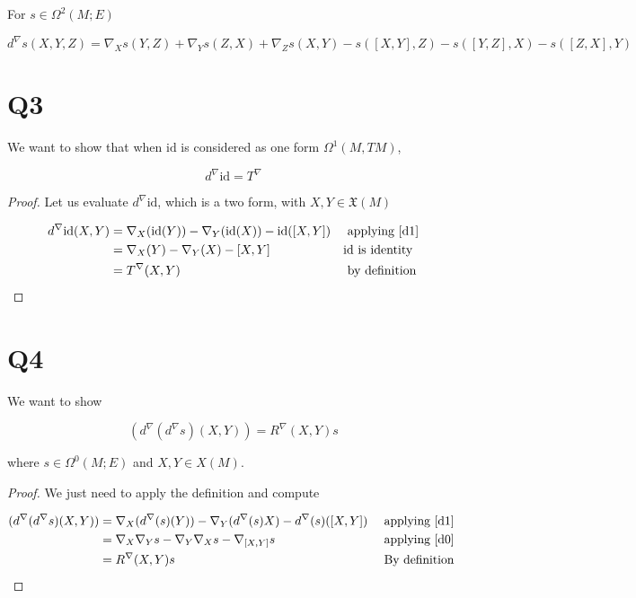 \documentclass{article}
\theoremstyle{definition}
\theoremstyle{definition}
\theoremstyle{remark}
\newcommand{\X}{\mathfrak{X}}
\newcommand{\id}{\text{id}}
\renewcommand{\d}{d^{\nabla}}
\newcommand{\R}{R^{\nabla}}
\begin{document}
For $s \in \Omega^2(M; E)$

\begin{dmath}
	\label{d2}
	\d s (X, Y, Z) = \nabla_X s (Y, Z) + \nabla_Y s(Z, X) + \nabla_Z s (X, Y) - s([X, Y], Z) - s([Y, Z], X) - s([Z, X], Y)
\end{dmath}

\section*{Q3}
We want to show that when $\id$ is considered as one form $\Omega^1(M, TM)$, 

$$
d^{\nabla} \id = T^{\nabla}
$$

\begin{proof}
	Let us evaluate $d^{\nabla}\id$, which is a two form, with $X, Y \in \X(M)$

	\begin{align*}
		d^{\nabla} \id (X, Y) 
		&= \nabla_X(\id(Y)) - \nabla_Y(\id(X)) - \id([X, Y])  && \text{ applying \eqref{d1}}\\ 
		&= \nabla_X(Y) - \nabla_Y(X) - [X, Y]  && \id \text{ is identity  }\\ 
		&= T^{\nabla}(X, Y) && \text{ by definition}\\ 
	\end{align*}
\end{proof}

\section*{Q4}

We want to show 

\begin{equation}
	(\d(\d s)(X, Y)) = \R(X, Y)s
\end{equation}

where $s \in \Omega^0(M; E)$ and $X, Y \in X(M)$.

\begin{proof}
	We just need to apply the definition and compute

	\begin{align*}
		(\d(\d s)(X, Y)) 
		&= \nabla_X(\d(s)(Y)) - \nabla_Y(\d(s)X) - \d(s)([X, Y]) && \text{ applying \eqref{d1}} \\ 
		&= \nabla_X \nabla_Y s - \nabla_Y \nabla_X s - \nabla_{[X, Y]}s  && \text{ applying \eqref{d0}} \\ 
		&= \R(X, Y)s && \text{ By definition }
	\end{align*}
\end{proof}
\end{document}
